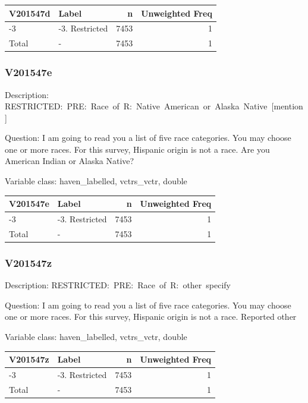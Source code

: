 \documentclass[
]{krantz}
\begin{document}
\begin{tabular}[t]{l|l|r|r}
\hline
V201547d & Label & n & Unweighted Freq\\
\hline
-3 & -3. Restricted & 7453 & 1\\
\hline
Total & - & 7453 & 1\\
\hline
\end{tabular}

\hypertarget{v201547e}{%
\subsubsection*{V201547e}\label{v201547e}}


Description: RESTRICTED:~PRE:~Race~of~R:~Native~American~or~Alaska~Native~{[}mention{]}

Question: I am going to read you a list of five race categories. You may choose one or more races. For this survey, Hispanic origin is not a race. Are you American Indian or Alaska Native?

Variable class: haven\_labelled, vctrs\_vctr, double

\begin{tabular}[t]{l|l|r|r}
\hline
V201547e & Label & n & Unweighted Freq\\
\hline
-3 & -3. Restricted & 7453 & 1\\
\hline
Total & - & 7453 & 1\\
\hline
\end{tabular}

\hypertarget{v201547z}{%
\subsubsection*{V201547z}\label{v201547z}}


Description: RESTRICTED:~PRE:~Race~of~R:~other~specify

Question: I am going to read you a list of five race categories. You may choose one or more races. For this survey, Hispanic origin is not a race. Reported other

Variable class: haven\_labelled, vctrs\_vctr, double

\begin{tabular}[t]{l|l|r|r}
\hline
V201547z & Label & n & Unweighted Freq\\
\hline
-3 & -3. Restricted & 7453 & 1\\
\hline
Total & - & 7453 & 1\\
\hline
\end{tabular}
\end{document}
